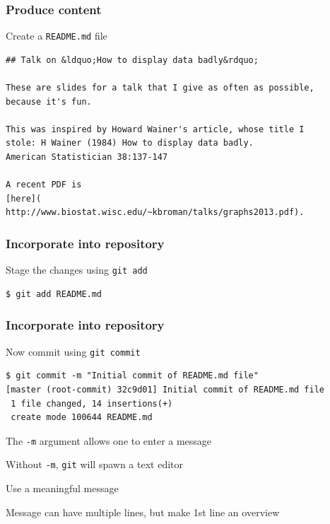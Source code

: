 \documentclass[12pt,t]{beamer}
\begin{document}
\begin{frame}[fragile]
\frametitle{Produce content}
\bbi
\item Create a {\tt README.md} file
\ei

\bigskip
\begin{lstlisting}
## Talk on &ldquo;How to display data badly&rdquo;

These are slides for a talk that I give as often as possible,
because it's fun.

This was inspired by Howard Wainer's article, whose title I
stole: H Wainer (1984) How to display data badly.
American Statistician 38:137-147

A recent PDF is
[here](
http://www.biostat.wisc.edu/~kbroman/talks/graphs2013.pdf).
\end{lstlisting}

\end{frame}


\begin{frame}[fragile]
\frametitle{Incorporate into repository}
\bbi
\item Stage the changes using {\tt \hilit git add}
\ei

\begin{lstlisting}
$ git add README.md
\end{lstlisting}

\end{frame}

\begin{frame}[fragile]
\frametitle{Incorporate into repository}
\bbi
\item Now commit using {\tt \hilit git commit}
\ei

\begin{lstlisting}
$ git commit -m "Initial commit of README.md file"
[master (root-commit) 32c9d01] Initial commit of README.md file
 1 file changed, 14 insertions(+)
 create mode 100644 README.md
\end{lstlisting}

\bi
\item The \texttt{-m} argument allows one to enter a message
\item Without \texttt{-m}, \texttt{git} will spawn a text editor
\item Use a meaningful message
\item Message can have multiple lines, but make 1st line an overview
\ei

\end{frame}
\end{document}
